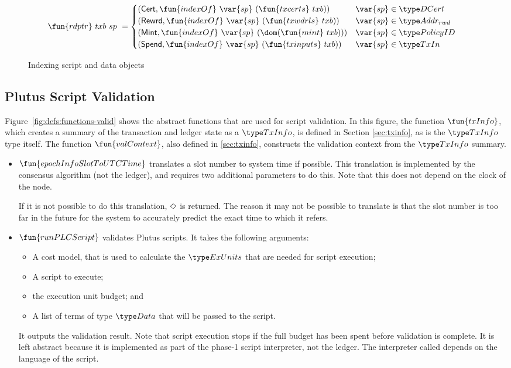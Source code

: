 \begin{figure}[htb]
\begin{align*}
    &\fun{rdptr}~txb~sp~ =
      \begin{cases}
        (\mathsf{Cert},\fun{indexOf}~\var{sp}~(\fun{txcerts}~{txb}))   & \var{sp} \in \DCert \\
        (\mathsf{Rewrd},\fun{indexOf}~\var{sp}~(\fun{txwdrls}~{txb}))   & \var{sp} \in \AddrRWD \\
        (\mathsf{Mint},\fun{indexOf}~\var{sp}~(\dom (\fun{mint}~{txb})))    & \var{sp} \in \PolicyID \\
        (\mathsf{Spend},\fun{indexOf}~\var{sp}~(\fun{txinputs}~{txb})) & \var{sp} \in \TxIn
      \end{cases}
  \end{align*}
  \caption{Indexing script and data objects}
  \label{fig:functions:script1}
\end{figure}


\subsection{Plutus Script Validation}
Figure~\ref{fig:defs:functions-valid} shows the abstract functions that are used for script validation.
In this figure, the function $\fun{txInfo}$, which creates a summary of the transaction
and ledger state as a $\TxInfo$, is defined in Section \ref{sec:txinfo}, as is the $\TxInfo$
type itself.
The function $\fun{valContext}$, also defined in \ref{sec:txinfo}, constructs the
validation context from the $\TxInfo$ summary.

\begin{itemize}
\item $\fun{epochInfoSlotToUTCTime}$ translates a slot number to system time if possible.
This translation is implemented by the consensus algorithm (not the ledger), and requires
two additional parameters to do this. Note that this does not depend on the clock of the node.

If it is not possible to do this translation, $\Diamond$ is returned.
The reason it may not be possible to translate is that the slot number
is too far in the future for the system to accurately
predict the exact time to which it refers.

\item
  $\fun{runPLCScript}$ validates Plutus scripts. It takes the following
  arguments:
  \begin{itemize}
  \item A cost model, that is used to calculate the $\ExUnits$ that are needed for script execution;
  \item A script to execute;
  \item the execution unit budget; and
  \item A list of terms of type $\Data$ that will be passed to the script.
  \end{itemize}
  It outputs the validation result.
  Note that script execution stops if the full budget has been spent before validation is complete.
  It is left abstract because it is implemented as part of the phase-1 script interpreter, not the ledger.
  The interpreter called depends on the language of the script.
\end{itemize}


